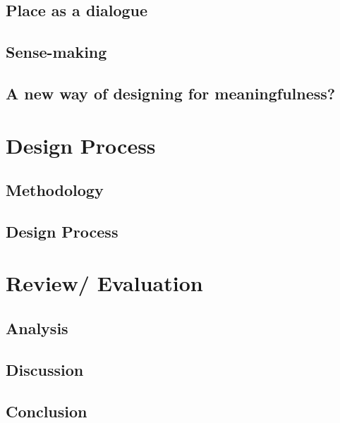 \documentclass[UKenglish]{ifimaster}
\begin{document}
\chapter{Place as a dialogue}


\chapter{Sense-making}

\chapter{A new way of designing for meaningfulness?}


\part{Design Process}
\chapter{Methodology}

\chapter{Design Process}


\part{Review/ Evaluation }
\chapter{Analysis}



\chapter{Discussion}


\chapter{Conclusion}


\backmatter{}
\printbibliography[nottype=online]


 \printbibliography[type=online,title={Web only}]


% 
\end{document}

